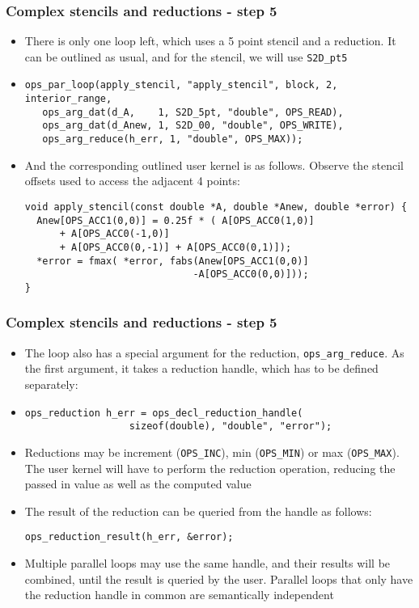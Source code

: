 \documentclass{beamer}
\begin{document}
\begin{frame}[fragile]
\frametitle{Complex stencils and reductions - step 5}
\begin{itemize}
\item There is only one loop left, which uses a 5 point stencil and a reduction. It can be outlined as usual, and for the stencil, we will use \texttt{S2D\_pt5}
\item \begin{lstlisting}
ops_par_loop(apply_stencil, "apply_stencil", block, 2, interior_range,
   ops_arg_dat(d_A,    1, S2D_5pt, "double", OPS_READ),
   ops_arg_dat(d_Anew, 1, S2D_00, "double", OPS_WRITE),
   ops_arg_reduce(h_err, 1, "double", OPS_MAX));
\end{lstlisting}  
  \item And the corresponding outlined user kernel is as follows. Observe the stencil offsets used to access the adjacent 4 points:
\begin{lstlisting}
void apply_stencil(const double *A, double *Anew, double *error) {
  Anew[OPS_ACC1(0,0)] = 0.25f * ( A[OPS_ACC0(1,0)] 
      + A[OPS_ACC0(-1,0)]
      + A[OPS_ACC0(0,-1)] + A[OPS_ACC0(0,1)]);
  *error = fmax( *error, fabs(Anew[OPS_ACC1(0,0)]
                             -A[OPS_ACC0(0,0)]));
}
\end{lstlisting}  
\end{itemize}
\end{frame}

\begin{frame}[fragile]
\frametitle{Complex stencils and reductions - step 5}
\begin{itemize}
\item The loop also has a special argument for the reduction, \texttt{ops\_arg\_reduce}. As the first argument, it takes a reduction handle, which has to be defined separately:
\item \begin{lstlisting}
ops_reduction h_err = ops_decl_reduction_handle(
                  sizeof(double), "double", "error");\end{lstlisting}  
  \item Reductions may be increment (\texttt{OPS\_INC}), min (\texttt{OPS\_MIN}) or max (\texttt{OPS\_MAX}). The user kernel will have to perform the reduction operation, reducing the passed in value as well as the computed value
  \item The result of the reduction can be queried from the handle as follows:
\begin{lstlisting}
ops_reduction_result(h_err, &error);
\end{lstlisting}  
\item Multiple parallel loops may use the same handle, and their results will be combined, until the result is queried by the user. Parallel loops that only have the reduction handle in common are semantically independent
\end{itemize}
\end{frame}
\end{document}
